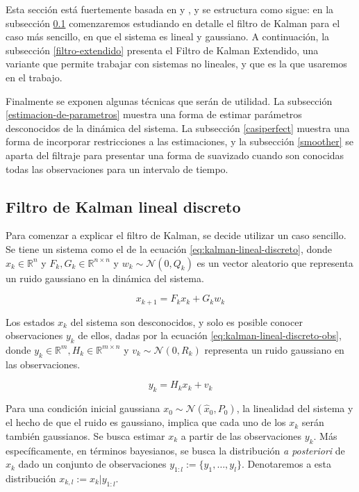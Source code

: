 Esta sección está fuertemente basada en \cite{Anderson2005} y \cite{Simon2006}, y se estructura como sigue: en la subsección \ref{filtro-lineal} comenzaremos estudiando en detalle el filtro de Kalman para el caso más sencillo, en que el sistema es lineal y gaussiano. A continuación, la subsección \ref{filtro-extendido} presenta el Filtro de Kalman Extendido, una variante que permite trabajar con sistemas no lineales, y que es la que usaremos en el trabajo.

Finalmente se exponen algunas técnicas que serán de utilidad. La subsección \ref{estimacion-de-parametros} muestra una forma de estimar parámetros desconocidos de la dinámica del sistema. La subsección \ref{casiperfect} muestra una forma de incorporar restricciones a las estimaciones, y la subsección \ref{smoother} se aparta del filtraje para presentar una forma de suavizado cuando son conocidas todas las observaciones para un intervalo de tiempo.

\subsection{Filtro de Kalman lineal discreto}\label{filtro-lineal}

Para comenzar a explicar el filtro de Kalman, se decide utilizar un caso sencillo. Se tiene un sistema como el de la ecuación \ref{eq:kalman-lineal-discreto}, donde \(x_k \in \mathbb{R}^{n}\) y \(F_k, G_k \in \mathbb{R}^{n \times n}\) y \(w_k \sim \mathcal{N}(0,Q_k)\) es un vector aleatorio que representa un ruido gaussiano en la dinámica del sistema. 

\begin{equation}\label{eq:kalman-lineal-discreto}
x_{k+1} = F_k x_k + G_k w_k
\end{equation}

Los estados \(x_k\) del sistema son desconocidos, y solo es posible conocer observaciones \(y_k\) de ellos, dadas por la ecuación \ref{eq:kalman-lineal-discreto-obs}, donde \(y_k \in \mathbb{R}^{m}, H_k \in \mathbb{R}^{m \times n}\) y \( v_k \sim \mathcal{N}(0, R_k)\) representa un ruido gaussiano en las observaciones.

\begin{equation}\label{eq:kalman-lineal-discreto-obs}
y_k = H_k x_k  + v_k
\end{equation}


Para una condición inicial gaussiana \(x_0 \sim \mathcal{N}(\hat{x}_0, P_0)\), la linealidad del sistema y el hecho de que el ruido es gaussiano, implica que cada uno de los \(x_k\) serán también gaussianos. Se busca estimar \(x_k\) a partir de las observaciones \(y_k\). Más específicamente, en términos bayesianos, se busca la distribución \textit{a posteriori} de \(x_k\) dado un conjunto de observaciones \(y_{1:l} := \{y_1, \dots, y_l\}\). Denotaremos a esta distribución \(x_{k,l}:= x_k | y_{1:l}\).

